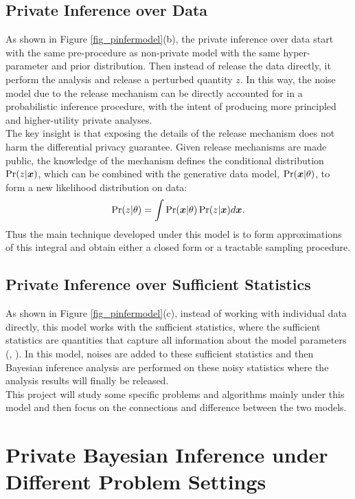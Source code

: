 \documentclass{article}
\begin{document}
\subsection{Private Inference over Data}
%
As shown in Figure \ref{fig_pinfermodel}(b), 
the private inference over data start with the same pre-procedure as non-private model with the same hyper-parameter and prior distribution.
%
Then instead of release the data directly, it perform the analysis and release a perturbed quantity $z$.
%
In this way, the noise model due to the release mechanism can be directly accounted for in a probabilistic inference procedure, 
with the intent of producing more principled and higher-utility private analyses.
%
\\
The key insight is that exposing the details of the release mechanism does not harm the differential privacy guarantee. 
Given release mechanisms are made public,
the knowledge of the mechanism defines the conditional distribution $\Pr(z |\boldsymbol{x})$,
which can be combined with the generative data model, $\Pr(\boldsymbol{x} | \theta)$, to form a new likelihood distribution on data:
\[
\Pr(z | \theta) = 
\int
\Pr(\boldsymbol{x} | \theta)
\Pr(z |\boldsymbol{x}) d \boldsymbol{x}.
\] 
%
Thus the main technique developed under this model is to form approximations of this integral and obtain either a closed form or a tractable sampling procedure.

\subsection{Private Inference over Sufficient Statistics}
%
As shown in Figure \ref{fig_pinfermodel}(c), instead of working with individual data directly,
this model works with the sufficient statistics,
where the sufficient statistics are quantities
that capture all information about the model parameters (\cite{foulds2016theory}, \cite{vu2009differential}).
%
In this model, noises are added to these sufficient statistics and then Bayesian inference analysis are performed on these noisy statistics where the analysis results will finally be released. 
%
\\
%
This project will study some specific problems and algorithms mainly under this model and then focus on the connections and difference between the two models.
%
\section{Private Bayesian Inference under Different Problem Settings}
%
\end{document}
